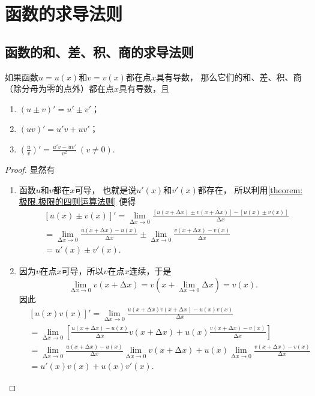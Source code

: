 \section{函数的求导法则}
\subsection{函数的和、差、积、商的求导法则}
\begin{theorem}
如果函数\(u=u(x)\)和\(v=v(x)\)都在点\(x\)具有导数，
那么它们的和、差、积、商（除分母为零的点外）都在点\(x\)具有导数，且
\begin{enumerate}
	\item \((u \pm v)' = u' \pm v'\)；
	\item \((uv)' = u'v + uv'\)；
	\item \(\left(\frac{u}{v}\right)' = \frac{u'v - uv'}{v^2}\ (v \neq 0)\).
\end{enumerate}
\begin{proof}
显然有
\begin{enumerate}
\item 函数\(u\)和\(v\)都在\(x\)可导，
也就是说\(u'(x)\)和\(v'(x)\)都存在，
所以利用\cref{theorem:极限.极限的四则运算法则} 便得
\begin{align*}
&[u(x) \pm v(x)]'
=\lim_{\increment x\to0} \frac{[u(x+\increment x) \pm v(x+\increment x)]-[u(x) \pm v(x)]}{\increment x} \\
&=\lim_{\increment x\to0} \frac{u(x+\increment x)-u(x)}{\increment x} \pm \lim_{\increment x\to0} \frac{v(x+\increment x)-v(x)}{\increment x} \\
&=u'(x) \pm v'(x).
\end{align*}

\item 因为\(v\)在点\(x\)可导，所以\(v\)在点\(x\)连续，于是\[
	\lim_{\increment x\to0} v(x+\increment x)
	= v\left(x+\lim_{\increment x\to0} \increment x\right)
	= v(x).
\]
因此
\begin{align*}
&[u(x) v(x)]'
=\lim_{\increment x\to0} \frac{u(x+\increment x) v(x+\increment x) - u(x) v(x)}{\increment x} \\
&=\lim_{\increment x\to0} \left[
 \frac{u(x+\increment x) - u(x)}{\increment x} v(x+\increment x) + u(x) \frac{v(x+\increment x) - v(x)}{\increment x}
 \right] \\
&=\lim_{\increment x\to0} \frac{u(x+\increment x) - u(x)}{\increment x} %
 \lim_{\increment x\to0} v(x+\increment x) %
 + u(x) \lim_{\increment x\to0} \frac{v(x+\increment x)-v(x)}{\increment x} \\
&=u'(x) v(x) + u(x) v'(x).
\end{align*}


\end{enumerate}
\end{proof}
\end{theorem}

